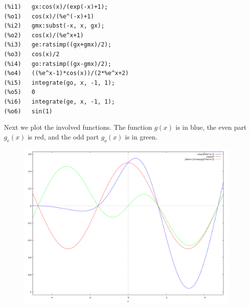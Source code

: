 \begin{verbatim}
(%i1)	gx:cos(x)/(exp(-x)+1);
(%o1)	cos(x)/(%e^(-x)+1)
(%i2)	gmx:subst(-x, x, gx);
(%o2)	cos(x)/(%e^x+1)
(%i3)	ge:ratsimp((gx+gmx)/2);
(%o3)	cos(x)/2
(%i4)	go:ratsimp((gx-gmx)/2);
(%o4)	((%e^x-1)*cos(x))/(2*%e^x+2)
(%i5)	integrate(go, x, -1, 1);
(%o5)	0
(%i6)	integrate(ge, x, -1, 1);
(%o6)	sin(1)
\end{verbatim}

Next we plot the involved functions. The function $g(x)$ is in blue, the even part $g_e(x)$ is red, and the odd part $g_o(x)$ is in green.

\begin{figure}[H]
\includegraphics[scale=0.3]{images/2016-02-09_plot_1.png}
\end{figure}





